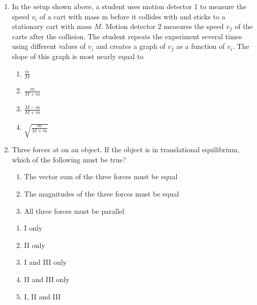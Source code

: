 \documentclass[11pt]{article}
\newcommand{\pic}[2]{\texttt{[image: \#2]}}
\begin{document}
\begin{multicols}{2}
\begin{enumerate}[leftmargin=18pt,resume]
    \begin{center}
      \pic{.48}{car-collision}
    \end{center}
  \item In the setup shown above, a student uses motion detector 1 to measure
    the speed $v_i$ of a cart with mass m before it collides with and sticks to
    a stationary cart with mass $M$. Motion detector 2 measures the speed $v_f$
    of the carts after the collision. The student repeats the experiment
    several times using different values of $v_i$ and creates a graph of $v_f$
    as a function of $v_i$. The slope of this graph is most nearly equal to
    \begin{enumerate}[noitemsep,topsep=0pt,leftmargin=18pt,label=(\Alph*)]
    \item$\displaystyle\frac{m}{M}$
    \item$\displaystyle\frac{m}{M+m}$
    \item$\displaystyle\frac{M-m}{M+m}$
    \item$\displaystyle\sqrt{\frac{m}{M+m}}$
    \end{enumerate}

  \item Three forces at on an object. If the object is in translational
    equilibrium, which of the following must be true?
    \begin{enumerate}[noitemsep,topsep=0pt,leftmargin=18pt,label={\Roman*.}]
    \item The vector sum of the three forces must be equal
    \item The magnitudes of the three forces must be equal
    \item All three forces must be parallel
    \end{enumerate}
    \begin{enumerate}[noitemsep,topsep=0pt,leftmargin=18pt,label=(\Alph*)]
    \item I only
    \item II only
    \item I and III only
    \item II and III only
    \item I, II and III
    \end{enumerate}
    
    \columnbreak
    

\end{enumerate}
\end{multicols}
\end{document}

